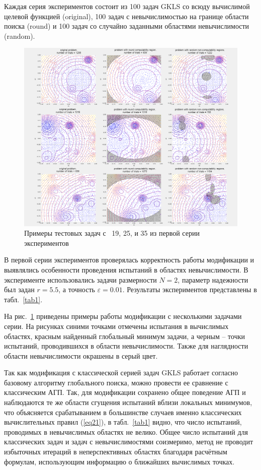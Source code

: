 \documentclass[10pt,a4paper]{book}
\begin{document}
Каждая серия экспериментов состоит из 100 задач GKLS со всюду вычислимой целевой функцией (original), 100 задач с невычислимостью на границе области поиска (round) и 100 задач со случайно заданными областями невычислимости (random).

\begin{figure}[h]
\includegraphics[width=\textwidth]{pic/fig6.png}
\caption{Примеры тестовых задач с \No~19, 25, и 35 из первой серии экспериментов} \label{fig6}
\end{figure}

В первой серии экспериментов проверялась корректность работы модификации и выявлялись особенности проведения испытаний в областях невычислимости. В эксперименте использовались задачи размерности $N=2$, параметр надежности был задан $r=5.5$, а точность $\varepsilon=0.01$. Результаты экспериментов представлены в табл.~\ref{tab1}.

На рис.~\ref{fig6} приведены примеры работы модификации с несколькими задачами серии. На рисунках синими точками отмечены испытания в вычислимых областях, красным найденный глобальный минимум задачи, а черным -- точки испытаний, проводившихся в области невычислимости. Также для наглядности области невычислимости окрашены в серый цвет.

Так как модификация с классической серией задач GKLS работает согласно базовому алгоритму глобального поиска, можно провести ее сравнение с классическим АГП. Так, для модификации сохранено общее поведение АГП и наблюдаются те же области сгущения испытаний вблизи локальных минимумов, что объясняется срабатыванием в большинстве случаев именно классических вычислительных правил (\ref{eq21}), в табл.~\ref{tab1} видно, что число испытаний, проводимых в невычислимых областях не велико. Общее число испытаний для классических задач и задач с невычислимостями соизмеримо, метод не проводит избыточных итераций в неперспективных областях благодаря расчётным формулам, использующим информацию о ближайших вычислимых точках. 
\end{document}
